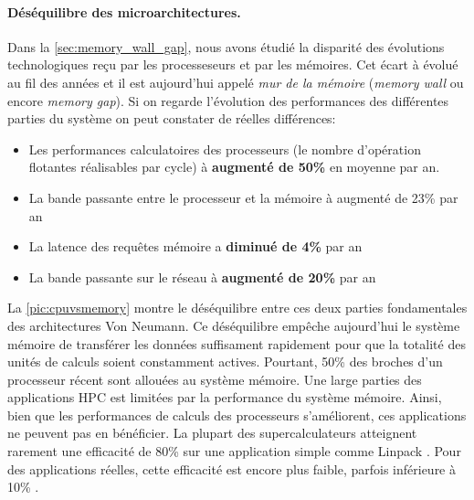         \paragraph{Déséquilibre des microarchitectures.} Dans la \autoref{sec:memory_wall_gap}, nous avons étudié la disparité des évolutions technologiques reçu par les processeseurs et par les mémoires. Cet écart à évolué au fil des années et il est aujourd'hui appelé \textit{mur de la mémoire} \cite{Rojas1997}  (\textit{memory wall} ou encore \textit{memory gap}). Si on regarde l'évolution des performances des différentes parties du système on peut constater de réelles différences:
            \begin{itemize}
                \item Les performances calculatoires des processeurs (le nombre d'opération flotantes réalisables par cycle) à \textbf{augmenté de 50\%} en moyenne par an.
                \item La bande passante entre le processeur et la mémoire à augmenté de 23\% par an
                \item La latence des requêtes mémoire a \textbf{diminué de 4\% }par an
                \item La bande passante sur le réseau à \textbf{augmenté de 20\%} par an
            \end{itemize}
        La \autoref{pic:cpuvsmemory} montre le déséquilibre entre ces deux parties fondamentales des architectures Von Neumann. Ce déséquilibre empêche aujourd'hui le système mémoire de transférer les données suffisament rapidement pour que la totalité des unités de calculs soient constamment actives. Pourtant, 50\% des broches d'un processeur récent sont allouées au système mémoire. Une large parties des applications HPC est limitées par la performance du système mémoire. Ainsi, bien que les performances de calculs des processeurs s'améliorent, ces applications ne peuvent pas en bénéficier. La plupart des supercalculateurs atteignent rarement une efficacité de 80\% sur une application simple comme Linpack \cite{Dongarra2003}. Pour des applications réelles, cette efficacité est encore plus faible, parfois inférieure à 10\% \cite{Oliker2005}.
            
